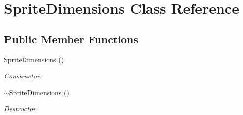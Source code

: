 \hypertarget{class_sprite_dimensions}{\section{Sprite\+Dimensions Class Reference}
\label{class_sprite_dimensions}
}
\subsection*{Public Member Functions}
\begin{DoxyCompactItemize}
\item 
\hypertarget{class_sprite_dimensions_a5ae560281c00f763641653b9e121614f}{\hyperlink{class_sprite_dimensions_a5ae560281c00f763641653b9e121614f}{Sprite\+Dimensions} ()}\label{class_sprite_dimensions_a5ae560281c00f763641653b9e121614f}

\begin{DoxyCompactList}\small\item\em Constructor. \end{DoxyCompactList}\item 
\hypertarget{class_sprite_dimensions_a9309ef0f1d831d1ca4e1c65fda492c5f}{\hyperlink{class_sprite_dimensions_a9309ef0f1d831d1ca4e1c65fda492c5f}{$\sim$\+Sprite\+Dimensions} ()}\label{class_sprite_dimensions_a9309ef0f1d831d1ca4e1c65fda492c5f}

\begin{DoxyCompactList}\small\item\em Destructor. \end{DoxyCompactList}\end{DoxyCompactItemize}

